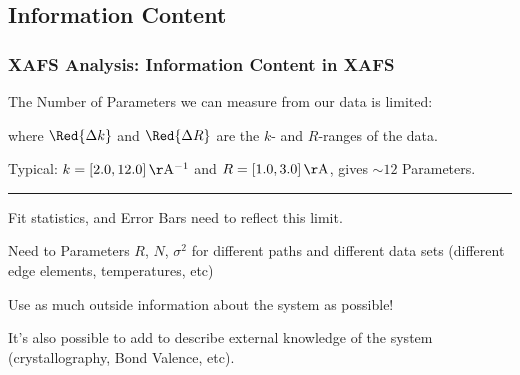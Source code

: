 \subsection{Information Content}
\begin{frame}
  \frametitle{XAFS Analysis: Information Content in XAFS }

  The Number of Parameters we can measure from our data is limited:

  \vmm

  \begin{center}  {}
  \end{center}

  \vmm

  where $\Red{ \Delta k}$ and $\Red{ \Delta R}$ are the $k$- and
  $R$-ranges of the data.

  Typical:  $k = [2.0, 12.0] \rm\,\AA^{-1}$ and $R =
  [1.0, 3.0]\rm\,\AA$, gives  $\sim 12$ Parameters.

  \pause \vmm \hrule \vmm

  Fit statistics, and Error Bars  need to reflect this limit.

  \vmm
  \pause

  Need to {} Parameters $R$, $N$,
  $\sigma^2$ for different paths  and different data sets (different
  edge elements, temperatures, etc)

  \vmm

  \begin{postitbox}{90mm}
    Use as much outside information about the system as possible!
  \end{postitbox}

   \vmm \pause
   It's also possible to add {} to describe external
   knowledge of the system (crystallography, Bond Valence, etc).


\end{frame}


